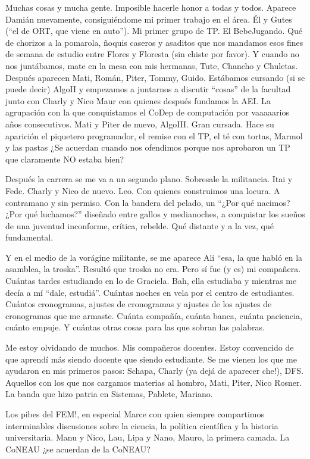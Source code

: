 Muchas cosas y mucha gente. Imposible hacerle honor a todas y todos. Aparece Damián nuevamente, consiguiéndome mi primer trabajo en el área. Él y Gutes (``el de ORT, que viene en auto''). Mi primer grupo de TP. El BebeJugando. Qué de chorizos a la pomarola, ñoquis caseros y asaditos que nos mandamos esos fines de semana de estudio entre Flores y Floresta (sin chiste por favor). Y cuando no nos juntábamos, mate en la mesa con mis hermanas, Tute, Chancho y Chuletas. Después aparecen Mati, Román, Piter, Tommy, Guido. Estábamos cursando (si se puede decir) AlgoII y empezamos a juntarnos a discutir ``cosas'' de la facultad junto con Charly y Nico Maur con quienes después fundamos la AEI. La agrupación con la que conquistamos el CoDep de computación por vaaaaarios años consecutivos. Mati y Piter de nuevo, AlgoIII. Gran cursada. Hace su aparición el piquetero programador, el remise con el TP, el té con tortas, Marmol y las pastas ¿Se acuerdan cuando nos ofendimos porque nos aprobaron un TP que claramente NO estaba bien?

Después la carrera se me va a un segundo plano. Sobresale la militancia. Itai y Fede. Charly y Nico de nuevo. Leo. Con quienes construimos una locura. A contramano y sin permiso. Con la bandera del pelado, un ``¿Por qué nacimos?¿Por qué luchamos?'' diseñado entre gallos y medianoches, a conquistar los sueños de una juventud inconforme, crítica, rebelde. Qué distante y a la vez, qué fundamental.

Y en el medio de la vorágine militante, se me aparece Ali ``esa, la que habló en la asamblea, la troska''. Resultó que troska no era. Pero sí fue (y es) mi compañera. Cuántas tardes estudiando en lo de Graciela. Bah, ella estudiaba y mientras me decía a mí ``dale, estudiá''. Cuántas noches en vela por el centro de estudiantes. Cuántos cronogramas, ajustes de cronogramas y ajustes de los ajustes de cronogramas que me armaste. Cuánta compañía, cuánta banca, cuánta paciencia, cuánto empuje. Y cuántas otras cosas para las que sobran las palabras.

Me estoy olvidando de muchos. Mis compañeros docentes. Estoy convencido de que aprendí más siendo docente que siendo estudiante. Se me vienen los que me ayudaron en mis primeros pasos: Schapa, Charly (ya dejá de aparecer che!), DFS. Aquellos con los que nos cargamos materias al hombro, Mati, Piter, Nico Rosner. La banda que hizo patria en Sistemas, Pablete, Mariano.

Los pibes del FEM!, en especial Marce con quien siempre compartimos interminables discusiones sobre la ciencia, la política científica y la historia universitaria. Manu y Nico, Lau, Lipa y Nano, Mauro, la primera camada. La CoNEAU ¿se acuerdan de la CoNEAU?

